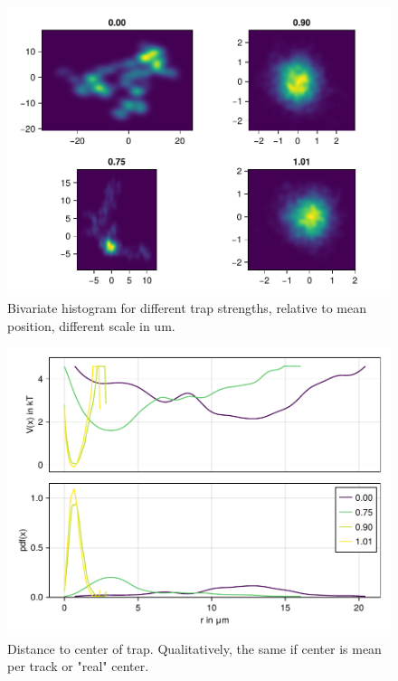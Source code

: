 \documentclass[
    parskip=half, 
    twoside=false,
    twocolumn=true,
    fontsize=11pt,
]{scrarticle}
\begin{document}
\begin{figure}[h]
    \centering
    \includegraphics{figures/01_03_1_bivariate.pdf}
    \caption{Bivariate histogram for different trap strengths, relative to mean position, different scale in um.}
\end{figure}

\begin{figure}
    \centering
    \includegraphics{figures/01_03_2_radial.pdf}
    \caption{Distance to center of trap. Qualitatively, the same if center is mean per track or "real" center.}
\end{figure}
\end{document}
